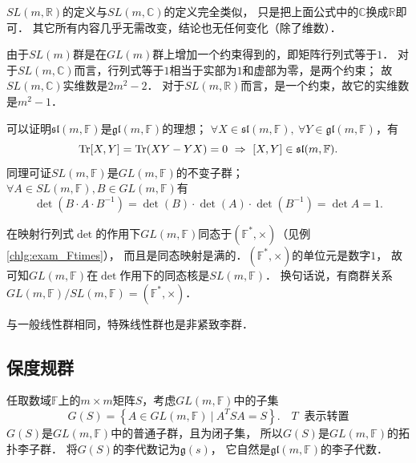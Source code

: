 

$SL(m,\mathbb{R})$的定义与$SL(m,\mathbb{C})$的定义完全类似，
只是把上面公式中的$\mathbb{C}$换成$\mathbb{R}$即可．
其它所有内容几乎无需改变，结论也无任何变化（除了维数）．

由于$SL(m)$群是在$GL(m)$群上增加一个约束得到的，即矩阵行列式等于$1$．
对于$SL(m,\mathbb{C})$而言，行列式等于$1$相当于实部为$1$和虚部为零，是两个约束；
故$SL(m,\mathbb{C})$实维数是$2m^2 -2$．
对于$SL(m,\mathbb{R})$而言，是一个约束，故它的实维数是$m^2-1$．

可以证明$\mathfrak{sl}(m,\mathbb{F})$是$\mathfrak{gl}(m,\mathbb{F})$的{\kaishu 理想}；
$\forall X \in \mathfrak{sl}(m,\mathbb{F}), \  \forall Y \in \mathfrak{gl}(m,\mathbb{F})$，有
\begin{equation}
    {\rm Tr}[X,Y]={\rm Tr}(XY-YX) = 0 \ \Rightarrow \ 
    [X,Y] \in \mathfrak{sl}(m,\mathbb{F}).
\end{equation}
同理可证$SL(m,\mathbb{F})$是$GL(m,\mathbb{F})$的{\kaishu 不变子群}；
$\forall A \in SL(m,\mathbb{F}),  B \in GL(m,\mathbb{F})$有
\begin{equation}
    \det\left(B\cdot A \cdot B^{-1}\right)
    =\det\left(B\right)\cdot\det\left(A\right)\cdot\det\left(B^{-1}\right)
    =\det A =1.
\end{equation}

在映射行列式$\det$的作用下$GL(m,\mathbb{F})$同态于$(\mathbb{F}^*,\times)$（见例\ref{chlg:exam_Ftimes}），
而且是同态映射是满的．$(\mathbb{F}^*,\times)$的单位元是数字$1$，
故可知$GL(m,\mathbb{F})$在$\det$作用下的同态核是$SL(m,\mathbb{F})$．
换句话说，有商群关系$GL(m,\mathbb{F})/SL(m,\mathbb{F})=(\mathbb{F}^*,\times)$．

与一般线性群相同，特殊线性群也是非紧致李群．





\subsection{保度规群}\label{chlg:sec_isometry}


任取数域$\mathbb{F}$上的$m\times m$矩阵$S$，考虑$GL(m,\mathbb{F})$中的子集
\begin{equation}\label{chlg:eqn_gsinit}
    G(S)= \left\{ A \in GL(m,\mathbb{F})\ |\  A^T S {A} =S \right\}.
    \quad  T\ \text{ 表示转置}
\end{equation}
$G(S)$是$GL(m,\mathbb{F})$中的普通子群，且为闭子集，
所以$G(S)$是$GL(m,\mathbb{F})$的拓扑李子群．
将$G(S)$的李代数记为$\mathfrak{g}(s)$，
它自然是$\mathfrak{gl}(m,\mathbb{F})$的李子代数．

